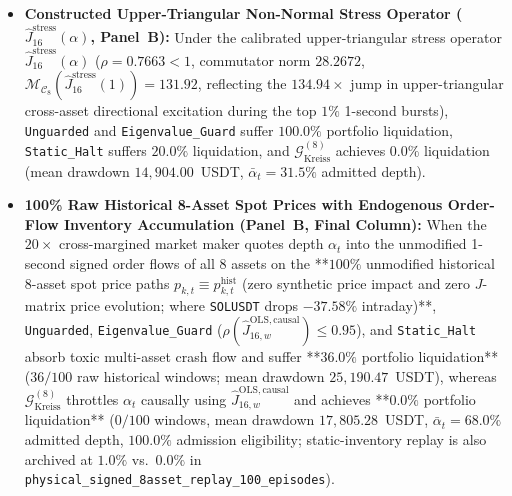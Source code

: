 \documentclass[12pt]{article}
\theoremstyle{definition}
\theoremstyle{remark}
\begin{document}
\begin{itemize}
\item \textbf{Constructed Upper-Triangular Non-Normal Stress Operator ($\hat{J}_{16}^{\mathrm{stress}}(\alpha)$, Panel~B):} Under the calibrated upper-triangular stress operator $\hat{J}_{16}^{\mathrm{stress}}(\alpha)$ ($\rho = 0.7663 < 1$, commutator norm $28.2672$, $\mathcal{M}_{\mathcal{C}_8}(\hat{J}_{16}^{\mathrm{stress}}(1)) = 131.92$, reflecting the $134.94\times$ jump in upper-triangular cross-asset directional excitation during the top $1\%$ 1-second bursts), \texttt{Unguarded} and \texttt{Eigenvalue\_Guard} suffer $100.0\%$ portfolio liquidation, \texttt{Static\_Halt} suffers $20.0\%$ liquidation, and $\mathcal{G}_{\mathrm{Kreiss}}^{(8)}$ achieves $0.0\%$ liquidation (mean drawdown $14{,}904.00$~USDT, $\bar{\alpha}_t = 31.5\%$ admitted depth).
\item \textbf{100\% Raw Historical 8-Asset Spot Prices with Endogenous Order-Flow Inventory Accumulation (Panel~B, Final Column):} When the $20\times$ cross-margined market maker quotes depth $\alpha_t$ into the unmodified 1-second signed order flows of all $8$ assets on the **$100\%$ unmodified historical 8-asset spot price paths $p_{k,t} \equiv p_{k,t}^{\mathrm{hist}}$ (zero synthetic price impact and zero $J$-matrix price evolution; where \texttt{SOLUSDT} drops $-37.58\%$ intraday)**, \texttt{Unguarded}, \texttt{Eigenvalue\_Guard} ($\rho(\hat{J}_{16,w}^{\mathrm{OLS,causal}}) \le 0.95$), and \texttt{Static\_Halt} absorb toxic multi-asset crash flow and suffer **$36.0\%$ portfolio liquidation** ($36/100$ raw historical windows; mean drawdown $25{,}190.47$~USDT), whereas $\mathcal{G}_{\mathrm{Kreiss}}^{(8)}$ throttles $\alpha_t$ causally using $\hat{J}_{16,w}^{\mathrm{OLS,causal}}$ and achieves **$0.0\%$ portfolio liquidation** ($0/100$ windows, mean drawdown $17{,}805.28$~USDT, $\bar{\alpha}_t = 68.0\%$ admitted depth, $100.0\%$ admission eligibility; static-inventory replay is also archived at $1.0\%$ vs.\ $0.0\%$ in \texttt{physical\_signed\_8asset\_replay\_100\_episodes}).
\end{itemize}


\end{document}
